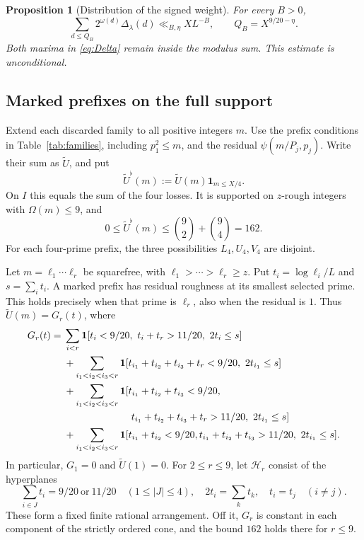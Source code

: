 \documentclass{amsart}
\newtheorem{proposition}[lemma]{Proposition}
\numberwithin{equation}{section}
\numberwithin{table}{section}
\newcommand{\ind}{\mathbf 1}
\begin{document}
\begin{proposition}[Distribution of the signed weight]\label{prop:BV9}
For every $B>0$,
\begin{equation}\label{eq:BV9}
\sum_{d\le Q_B}2^{\omega(d)}\Delta_\lambda(d)
\ll_{B,\eta}XL^{-B},\qquad Q_B=X^{9/20-\eta}.
\end{equation}
Both maxima in \eqref{eq:Delta} remain inside the modulus sum.
This estimate is unconditional.
\end{proposition}

\subsection{Marked prefixes on the full support}

Extend each discarded family to all positive integers $m$. Use the
prefix conditions in Table~\ref{tab:families}, including $p_1^2\le m$,
and the residual $\psi(m/P_j,p_j)$. Write their sum as $\widetilde U$,
and put
\[
\widetilde U^\flat(m):=\widetilde U(m)\ind_{m\le X/4}.
\]
On $I$ this equals the sum of the four losses. It is supported on $z$-rough integers with $\Omega(m)\le9$, and
\begin{equation}\label{eq:Uflat-bound}
0\le\widetilde U^\flat(m)\le\binom92+\binom94=162.
\end{equation}
For each four-prime prefix, the three possibilities $L_4,U_4,V_4$ are disjoint.

Let $m=\ell_1\cdots\ell_r$ be squarefree, with
$\ell_1>\cdots>\ell_r\ge z$.
Put $t_i=\log\ell_i/L$ and $s=\sum_i t_i$.
A marked prefix has residual roughness at its smallest selected prime.
This holds precisely when that prime is $\ell_r$, also when the residual
is $1$. Thus $\widetilde U(m)=G_r(t)$, where
\begin{equation}\label{eq:marked-prefixes}
\begin{split}
G_r(t)={}&\sum_{i<r}
\ind[t_i<9/20,\ t_i+t_r>11/20,\ 2t_i\le s]\\
&+\sum_{i_1<i_2<i_3<r}
\ind[t_{i_1}+t_{i_2}+t_{i_3}+t_r<9/20,\ 2t_{i_1}\le s]\\
&+\sum_{i_1<i_2<i_3<r}
\ind[t_{i_1}+t_{i_2}+t_{i_3}<9/20,\\
&\hspace{24mm}t_{i_1}+t_{i_2}+t_{i_3}+t_r>11/20,\ 2t_{i_1}\le s]\\
&+\sum_{i_1<i_2<i_3<r}
\ind[t_{i_1}+t_{i_2}<9/20,
t_{i_1}+t_{i_2}+t_{i_3}>11/20,\ 2t_{i_1}\le s].
\end{split}
\end{equation}
In particular, $G_1=0$ and $\widetilde U(1)=0$.
For $2\le r\le9$, let $\mathcal H_r$ consist of the hyperplanes
\begin{equation}\label{eq:boundary-hyperplanes}
\sum_{i\in J}t_i=9/20\ \text{or}\ 11/20\quad(1\le|J|\le4),
\quad 2t_i=\sum_kt_k,\quad t_i=t_j\quad(i\ne j).
\end{equation}
These form a fixed finite rational arrangement. Off it, $G_r$ is constant
in each component of the strictly ordered cone, and the bound $162$ holds
there for $r\le9$.
\end{document}
